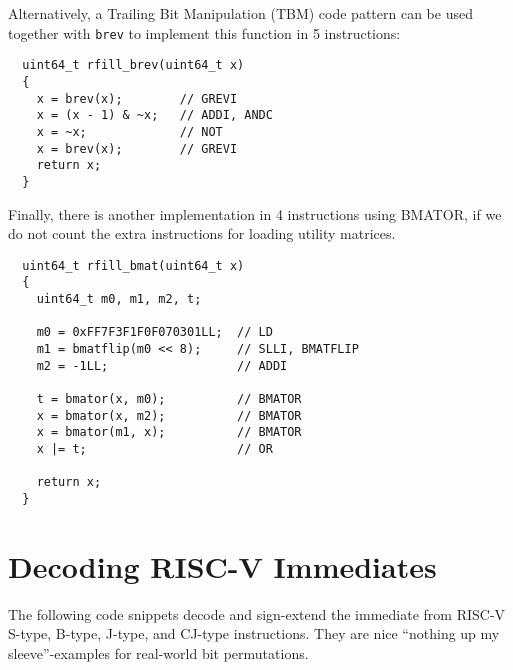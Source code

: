 Alternatively, a Trailing Bit Manipulation (TBM) code pattern can be used
together with {\tt brev} to implement this function in 5 instructions:

\begin{minipage}{\linewidth}
\begin{verbatim}
  uint64_t rfill_brev(uint64_t x)
  {
    x = brev(x);        // GREVI
    x = (x - 1) & ~x;   // ADDI, ANDC
    x = ~x;             // NOT
    x = brev(x);        // GREVI
    return x;
  }
\end{verbatim}
\end{minipage}

Finally, there is another implementation in 4 instructions using BMATOR, if we do
not count the extra instructions for loading utility matrices.

\begin{minipage}{\linewidth}
\begin{verbatim}
  uint64_t rfill_bmat(uint64_t x)
  {
    uint64_t m0, m1, m2, t;

    m0 = 0xFF7F3F1F0F070301LL;  // LD
    m1 = bmatflip(m0 << 8);     // SLLI, BMATFLIP
    m2 = -1LL;                  // ADDI

    t = bmator(x, m0);          // BMATOR
    x = bmator(x, m2);          // BMATOR
    x = bmator(m1, x);          // BMATOR
    x |= t;                     // OR

    return x;
  }
\end{verbatim}
\end{minipage}


\section{Decoding RISC-V Immediates}

The following code snippets decode and sign-extend the immediate from RISC-V
S-type, B-type, J-type, and CJ-type instructions. They are nice ``nothing up my
sleeve''-examples for real-world bit permutations.

